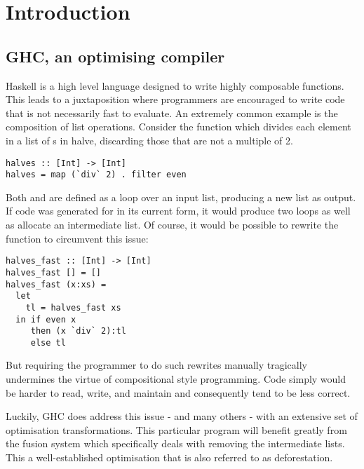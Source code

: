 \chapter{Introduction}

\section{GHC, an optimising compiler}

Haskell is a high level language designed to write highly composable functions.
This leads to a juxtaposition where programmers are encouraged to write code that
is not necessarily fast to evaluate. An extremely common example is the composition
of list operations. Consider the function  which divides each element
in a list of s in halve, discarding those that are not a multiple of 2.

\begin{listing}[H]
\begin{verbatim}
halves :: [Int] -> [Int]
halves = map (`div` 2) . filter even
\end{verbatim}
\end{listing}

Both  and  are defined as a loop over an input list, producing a new list as output. 
If code was generated for  in its current form, it would produce two loops as well as allocate
an intermediate list. Of course, it would be possible to rewrite the function to circumvent this
issue:

\begin{listing}[H]
\begin{verbatim}
halves_fast :: [Int] -> [Int]
halves_fast [] = []
halves_fast (x:xs) = 
  let 
    tl = halves_fast xs 
  in if even x 
     then (x `div` 2):tl
     else tl
\end{verbatim}
\end{listing}

But requiring the programmer to do such rewrites manually tragically undermines
the virtue of compositional style programming. Code simply would be harder to read, write,
and maintain and consequently tend to be less correct. 

Luckily, GHC does address this issue - and many others - with an extensive set of optimisation transformations.
This particular program will benefit greatly from the fusion system which specifically deals with removing
the intermediate lists. This a well-established optimisation that is also referred to as deforestation. \cite{WADLER1990231}

